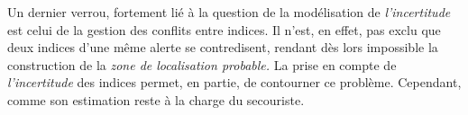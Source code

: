 Un dernier verrou, fortement lié à la question de la modélisation de
\emph{l'incertitude} est celui de la gestion des conflits entre
indices. Il n'est, en effet, pas exclu que deux indices d'une même
alerte se contredisent, rendant dès lors impossible la construction de
la \emph{zone de localisation probable.} La prise en compte de
\emph{l'incertitude} des indices permet, en partie, de contourner ce
problème. Cependant, comme son estimation reste à la charge du
secouriste.





